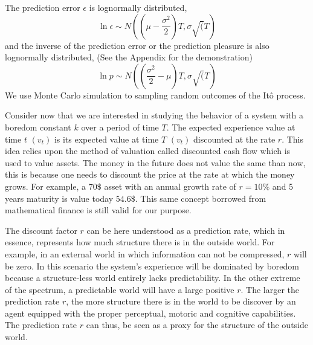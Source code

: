 \documentclass[11pt, onecolumn]{article}
\begin{document}
The prediction error $\epsilon$ is lognormally distributed, 
\begin{equation*}
\ln \epsilon \sim N((\mu -\frac{\sigma^2}{2})T, \sigma \sqrt(T)
\end{equation*}
and the inverse of the prediction error or the prediction pleasure is also lognormally distributed, (See the Appendix for the demonstration)
\begin{equation*}
\ln p \sim N((\frac{\sigma^2}{2} - \mu)T, \sigma \sqrt(T)
\end{equation*}
We use Monte Carlo simulation to sampling random outcomes of the It\^{o} process.

Consider now that we are interested in studying the behavior of a system with a boredom constant $k$ over a period of time $T$. The expected experience value at time $t$ $(v_t)$ is its expected value at time $T$ $(v_t)$ discounted at the rate $r$. This idea relies upon the method of valuation called discounted cash flow which is used to value assets. The money in the future does not value the same than now, this is because one needs to discount the price at the rate at which the money grows. For example, a $70\$$ asset with an annual growth rate of $r=10\%$ and 5 years maturity is value today $54.6\$$. This same concept borrowed from mathematical finance is still valid for our purpose.

The discount factor $r$ can be here understood as a prediction rate, which in essence, represents how much structure there is in the outside world. For example, in an external world in which information can not be compressed, $r$ will be zero. In this scenario the system's experience will be dominated by boredom because a structure-less world entirely lacks predictability. 
In the other extreme of the spectrum, a predictable world will have a large positive $r$. The larger the prediction rate $r$, the more structure there is in the world to be discover by an agent equipped with the proper perceptual, motoric and cognitive capabilities. The prediction rate $r$ can thus, be seen as a proxy for the structure of the outside world. 
\end{document}
